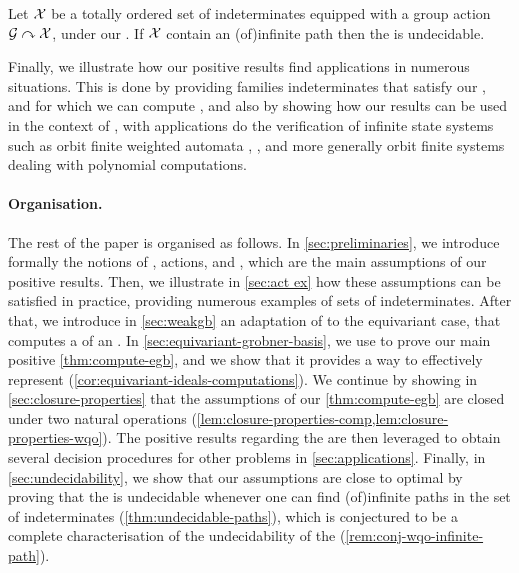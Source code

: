 \begin{theorem}[name={Undecidability of Equivariant Ideal Membership},restate=thm:undecidable-paths]
  \label{thm:undecidable-paths}
  Let $\mathcal{X}$ be a totally ordered set of indeterminates
  equipped with a group action $\mathcal{G} \curvearrowright \mathcal{X}$, under our .
  If $\mathcal{X}$ contain an \kl(of){infinite path}
  then the  is undecidable.
\end{theorem}

Finally, we illustrate how our positive results find applications in numerous
situations. This is done by providing families indeterminates that satisfy our
, and for which we can compute , and also by showing how our results can be used in the context
of  \cite{JGL10}, with
applications do the verification of infinite state systems such as orbit
finite weighted automata \cite{BOKLMO21}, , and more generally orbit finite systems dealing with polynomial
computations.

\paragraph{Organisation.} \AP The rest of the paper is organised as follows. In
\cref{sec:preliminaries}, we introduce formally the notions of ,  actions, and ,
which are the main assumptions of our positive results. Then, we illustrate in
\cref{sec:act ex} how these assumptions can be satisfied in practice, providing
numerous examples of sets of indeterminates. After that, we introduce in
\cref{sec:weakgb} an adaptation of  to the
equivariant case, that computes a  of an
. In \cref{sec:equivariant-grobner-basis}, we use
 to prove our main positive
\cref{thm:compute-egb}, and we show that it provides a way to effectively
represent  (\cref{cor:equivariant-ideals-computations}).
We continue by showing in \cref{sec:closure-properties} that the assumptions of our
\cref{thm:compute-egb} are closed under two natural operations
(\cref{lem:closure-properties-comp,lem:closure-properties-wqo}). The positive
results regarding the  are then
leveraged to obtain several decision procedures for other problems in
\cref{sec:applications}. Finally, in \cref{sec:undecidability}, we show that
our assumptions are close to optimal by proving that the  is undecidable whenever one can find \kl(of){infinite
paths} in the set of indeterminates (\cref{thm:undecidable-paths}), which is
conjectured to be a complete characterisation of the undecidability of the
 (\cref{rem:conj-wqo-infinite-path}).
